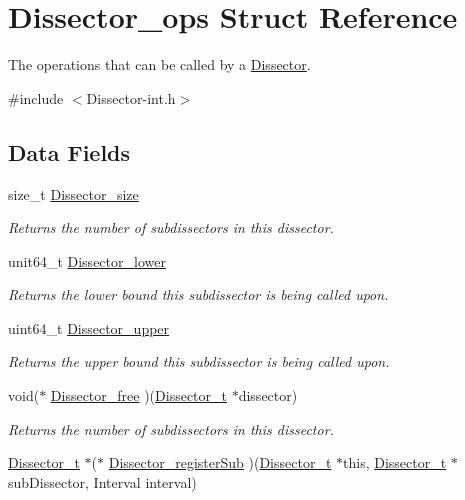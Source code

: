 \hypertarget{struct_dissector__ops}{}\section{Dissector\+\_\+ops Struct Reference}
\label{struct_dissector__ops}


The operations that can be called by a \hyperlink{struct_dissector}{Dissector}.  




{\ttfamily \#include $<$Dissector-\/int.\+h$>$}

\subsection*{Data Fields}
\begin{DoxyCompactItemize}
\item 
size\+\_\+t \hyperlink{struct_dissector__ops_a8982a0368e988bc9cb93ee83d5411b99}{Dissector\+\_\+size}
\begin{DoxyCompactList}\small\item\em Returns the number of subdissectors in this dissector. \end{DoxyCompactList}\item 
unit64\+\_\+t \hyperlink{struct_dissector__ops_a12f42148d4173471c21f3b33296d9256}{Dissector\+\_\+lower}
\begin{DoxyCompactList}\small\item\em Returns the lower bound this subdissector is being called upon. \end{DoxyCompactList}\item 
uint64\+\_\+t \hyperlink{struct_dissector__ops_a3d9e177f508734b6136538e051b64699}{Dissector\+\_\+upper}
\begin{DoxyCompactList}\small\item\em Returns the upper bound this subdissector is being called upon. \end{DoxyCompactList}\item 
void($\ast$ \hyperlink{struct_dissector__ops_aa783c09975ec10c4b01884938d543346}{Dissector\+\_\+free} )(\hyperlink{struct_dissector}{Dissector\+\_\+t} $\ast$dissector)
\begin{DoxyCompactList}\small\item\em Returns the number of subdissectors in this dissector. \end{DoxyCompactList}\item 
\hyperlink{struct_dissector}{Dissector\+\_\+t} $\ast$($\ast$ \hyperlink{struct_dissector__ops_a66cf6888070f1e49cfa555ef28a96f8a}{Dissector\+\_\+register\+Sub} )(\hyperlink{struct_dissector}{Dissector\+\_\+t} $\ast$this, \hyperlink{struct_dissector}{Dissector\+\_\+t} $\ast$sub\+Dissector, Interval interval)

\end{DoxyCompactItemize}

